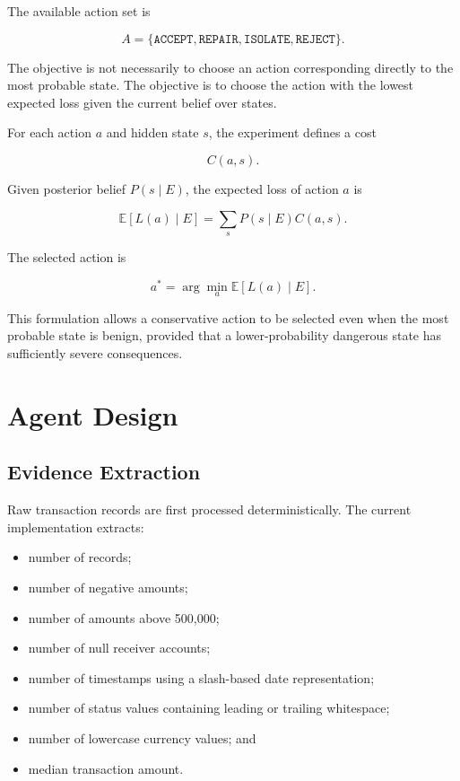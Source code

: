 \documentclass{article}
\begin{document}
The available action set is

\[
A =
\{
\texttt{ACCEPT},
\texttt{REPAIR},
\texttt{ISOLATE},
\texttt{REJECT}
\}.
\]

The objective is not necessarily to choose an action corresponding directly to the most probable state. The objective is to choose the action with the lowest expected loss given the current belief over states.

For each action \(a\) and hidden state \(s\), the experiment defines a cost

\[
C(a,s).
\]

Given posterior belief \(P(s\mid E)\), the expected loss of action \(a\) is

\[
\mathbb{E}[L(a)\mid E]
=
\sum_s
P(s\mid E)C(a,s).
\]

The selected action is

\[
a^*
=
\arg\min_a
\mathbb{E}[L(a)\mid E].
\]

This formulation allows a conservative action to be selected even when the most probable state is benign, provided that a lower-probability dangerous state has sufficiently severe consequences.


\section{Agent Design}

\subsection{Evidence Extraction}

Raw transaction records are first processed deterministically. The current implementation extracts:

\begin{itemize}
    \item number of records;
    \item number of negative amounts;
    \item number of amounts above 500,000;
    \item number of null receiver accounts;
    \item number of timestamps using a slash-based date representation;
    \item number of status values containing leading or trailing whitespace;
    \item number of lowercase currency values; and
    \item median transaction amount.
\end{itemize}
\end{document}
